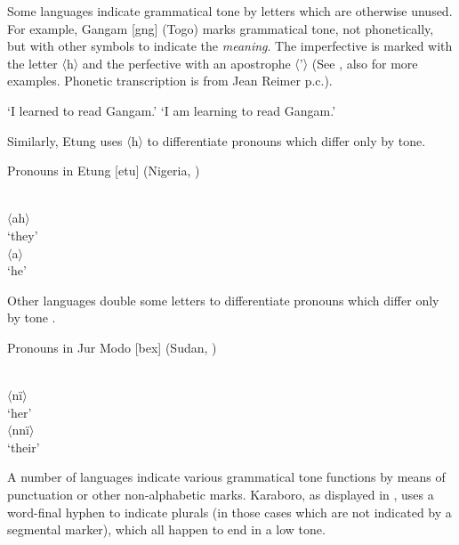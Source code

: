 \documentclass[output=paper]{langscibook}
\begin{document}
Some languages indicate grammatical tone by letters which are otherwise unused. For example, Gangam [gng] (Togo) marks grammatical tone, not phonetically, but with other symbols to indicate the \textit{meaning}. The imperfective is marked with the letter 〈h〉 and the perfective with an apostrophe 〈’〉 (See \citealt{HigdonEtAl2000}, also \citealt{Roberts2013} for more examples. Phonetic transcription is from Jean Reimer p.c.).

    \begin{exe}
        \ex \label{ex:ToneByUnusedLetters:3}
        \begin{xlist}
               \glt  `I learned to read Gangam.'
            \glt `I am learning to read Gangam.'
        \end{xlist}
\end{exe}
    
Similarly, Etung  uses 〈h〉 to differentiate pronouns which differ only by tone.

\ea Pronouns in Etung [etu] (Nigeria, \citealt{Harley2012})\label{tab:EtungPronouns}\setlength{\multicolsep}{0pt}
\begin{multicols}{2}\ea\gll\relax [á]\\ $\langle$ah$\rangle$ \\\glt `they'
\ex\gll\relax [à]\\ $\langle$a$\rangle$ \\\glt `he'
\z\end{multicols}\z
    
Other languages double some letters to differentiate pronouns which differ only by tone .

\ea Pronouns in Jur Modo [bex] (Sudan, \citealt{Persson2004})\label{tab:JurModoLetterDoubling}\setlength{\multicolsep}{0pt}
\begin{multicols}{2}\ea \gll\relax [nì] \\ $\langle$nï$\rangle$ \\\glt ‘her’
\ex \gll\relax [ní] \\ $\langle$nnï$\rangle$ \\\glt ‘their’
\z\end{multicols}\z

A number of languages indicate various grammatical tone functions by means of punctuation or other non-alphabetic marks. Karaboro, as displayed in , uses a word-final hyphen to indicate plurals (in those cases which are not indicated by a segmental marker), which all happen to end in a low tone.
\end{document}
